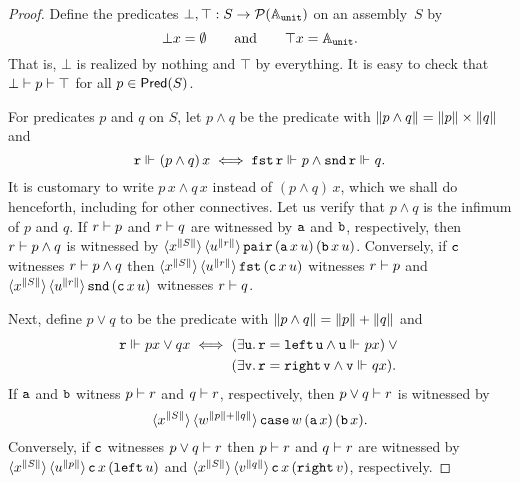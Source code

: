 \begin{proof}
  Define the predicates $\bot, \top : S \to \mathcal{P}(\mathbb{A}_{\mathtt{unit}})$ on an assembly~$S$ by
  \begin{equation*}
    \bot x= \emptyset
    \qquad\text{and}\qquad
    \top x = \mathbb{A}_{\mathtt{unit}}.
  \end{equation*}
  That is, $\bot$ is realized by nothing and $\top$ by everything. It is
  easy to check that $\bot \vdash p \vdash \top$ for all $p \in
  \mathsf{Pred}(S)$.

  For predicates $p$ and $q$ on $S$, let $p \land q$ be the
  predicate with $\|p \land q\| = \|p\| \times
  \|q\|$ and
  \begin{equation*}
    \mathtt{r} \Vdash_{} (p \land q) \, x
    \iff
    \mathtt{fst}\,\mathtt{r} \Vdash_{} p \land \mathtt{snd}\,\mathtt{r} \Vdash_{} q.
  \end{equation*}
  It is customary to write $p \, x \land q \, x$ instead of $(p \land q) \, x$, which we shall do henceforth, including for other connectives.
  Let us verify that $p \land q$ is the infimum of $p$ and $q$. If $r \vdash p$ and
  $r \vdash q$ are witnessed by $\mathtt{a}$ and $\mathtt{b}$, respectively, then $r \vdash p \land q$
  is witnessed by $\langle x^{\|S\|} \rangle\, \langle u^{\|r\|} \rangle\, \mathtt{pair}\,(\mathtt{a}\,x\,u)\,(\mathtt{b}\,x\,u)$.
  Conversely, if $\mathtt{c}$ witnesses $r \vdash p \land q$ then
  $\langle x^{\|S\|} \rangle\, \langle u^{\|r\|} \rangle\, \mathtt{fst}\,(\mathtt{c}\,x\,u)$ witnesses $r \vdash p$ and $\langle x^{\|S\|} \rangle\, \langle u^{\|r\|} \rangle\, \mathtt{snd}\,(\mathtt{c}\,x\,u)$ witnesses $r \vdash q$.

  Next, define $p \lor q$ to be the predicate with $\|p \land q\| = \|p\| + \|q\|$ and
  \begin{equation*}
    \mathtt{r} \Vdash_{} p x \lor q x
    \iff
    \begin{aligned}[t]
      & (\exists \mathtt{u} .\, \mathtt{r} = \mathtt{left}\,\mathtt{u} \land \mathtt{u} \Vdash_{} p x)
      \lor {} \\
      & (\exists \mathtt{v} .\, \mathtt{r} = \mathtt{right}\,\mathtt{v} \land \mathtt{v} \Vdash_{} q x).
    \end{aligned}
  \end{equation*}
  If $\mathtt{a}$ and $\mathtt{b}$ witness $p \vdash r$ and $q \vdash r$, respectively, then
  $p \lor q \vdash r$ is witnessed by
  \begin{equation*}
    \langle x^{\|S\|} \rangle\, \langle w^{\|p\|+\|q\|} \rangle\,{
      \mathtt{case}\,w\,(\mathtt{a}\,x)\,(\mathtt{b}\,x)
    }.
  \end{equation*}
  Conversely, if $\mathtt{c}$ witnesses $p \lor q \vdash r$ then
  $p \vdash r$ and $q \vdash r$ are witnessed by
  $\langle x^{\|S\|} \rangle\, \langle u^{\|p\|} \rangle\,{\mathtt{c}\,x\,(\mathtt{left}\,u})$
  and
  $\langle x^{\|S\|} \rangle\, \langle v^{\|q\|} \rangle\,{\mathtt{c}\,x\,(\mathtt{right}\,v})$,
  respectively.


\end{proof}
